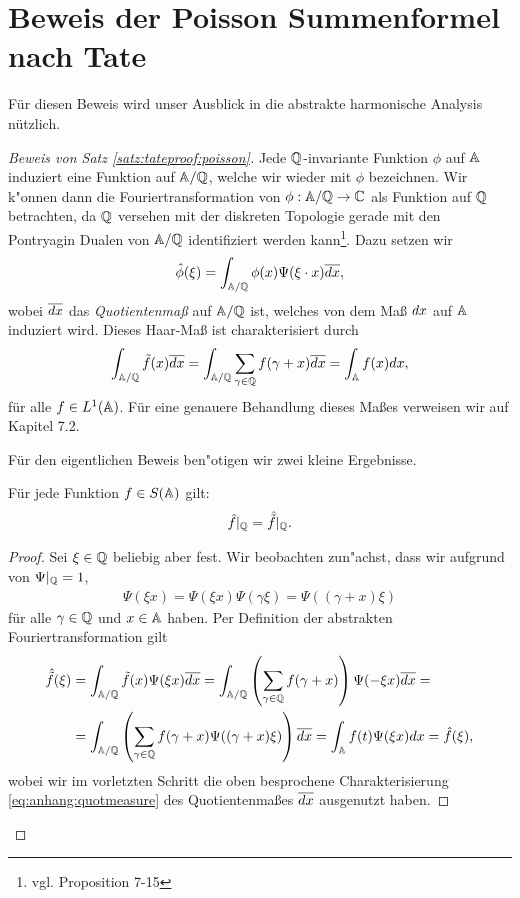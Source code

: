 \section{Beweis der Poisson Summenformel nach Tate}
	Für diesen Beweis wird unser Ausblick in die abstrakte harmonische Analysis nützlich.
	\begin{proof}[Beweis von Satz \ref{satz:tateproof:poisson}]
		Jede $\mathbb{Q}$-invariante Funktion $\phi$ auf $\mathbb{A}$ induziert eine Funktion auf $\mathbb{A}/\mathbb{Q}$, welche wir wieder mit $\phi$ bezeichnen.
		Wir k"onnen dann die Fouriertransformation von $\phi: \mathbb{A}/\mathbb{Q} \rightarrow \mathbb{C}$ als Funktion auf $\mathbb{Q}$ betrachten, da $\mathbb{Q}$ versehen mit der diskreten Topologie gerade mit den Pontryagin Dualen von $\mathbb{A}/\mathbb{Q}$ identifiziert werden kann\footnote{vgl. \textcite{rama} Proposition 7-15}. 
		Dazu setzen wir
		\begin{align*}
			\hat{\phi}(\xi) = \int_{\mathbb{A}/\mathbb{Q}}\phi(x)\Psi(\xi \cdot x)\overline{d{x}},
		\end{align*}
		wobei $\overline{d{x}}$ das \emph{Quotientenmaß} auf $\mathbb{A}/\mathbb{Q}$ ist, welches von dem Maß $d{x}$ auf $\mathbb{A}$ induziert wird. 
		Dieses Haar-Maß ist charakterisiert durch
		\begin{align}\label{eq:anhang:quotmeasure}
			\int_{\mathbb{A}/\mathbb{Q}}\tilde{f}(x)\overline{d{x}} =
			\int_{\mathbb{A}/\mathbb{Q}}\sum_{\gamma \in \mathbb{Q}}f(\gamma+x)\overline{d{x}} =
			\int_{\mathbb{A}} f(x)d{x},
		\end{align}
		für alle $f\in L^1(\mathbb{A})$. 
		Für eine genauere Behandlung dieses Maßes verweisen wir auf \textcite{knightly} Kapitel 7.2.
		
		Für den eigentlichen Beweis ben"otigen wir zwei kleine Ergebnisse.
		\begin{lemma}\label{lemma:anhang:tate1}
			Für jede Funktion $f \in S(\mathbb{A})$ gilt:
			\begin{align*}
				\hat{f}|_{\mathbb{Q}} = \hat{\tilde{f}}|_{\mathbb{Q}}.
			\end{align*}
		\end{lemma}
		\begin{proof}
			Sei $\xi \in \mathbb{Q}$ beliebig aber fest. 
			Wir beobachten zun"achst, dass wir aufgrund von $\Psi|_{\mathbb{Q}} =1$,
			\begin{align*}
				\Psi(\xi x)= \Psi(\xi x)\Psi(\gamma \xi)=\Psi((\gamma + x) \xi)
			\end{align*}
			für alle $\gamma \in \mathbb{Q}$ und $x\in \mathbb{A}$ haben. 
			Per Definition der abstrakten Fouriertransformation gilt
			\begin{align*}
				\hat{\tilde{f}}(\xi)	
					&= \int_{\mathbb{A} / \mathbb{Q}} {\tilde{f}(x)\Psi(\xi x)\overline{d{x}}} 
					 = \int_{\mathbb{A} / \mathbb{Q}} \left(\sum_{\gamma \in \mathbb{Q}}{f(\gamma + x)}\right)\Psi(-\xi x)\overline{d{x}} =\\
					&= \int_{\mathbb{A} / \mathbb{Q}} \left(\sum_{\gamma \in \mathbb{Q}}{f(\gamma + x)}\Psi((\gamma + x)\xi)\right)\overline{d{x}}
					 = \int_{\mathbb{A}} f(t)\Psi(\xi x)d{x} = \hat{f}(\xi),
			\end{align*}
			wobei wir im vorletzten Schritt die oben besprochene Charakterisierung \eqref{eq:anhang:quotmeasure} des Quotientenmaßes $\overline{d{x}}$ ausgenutzt haben.
		\end{proof}
		

\end{proof}

